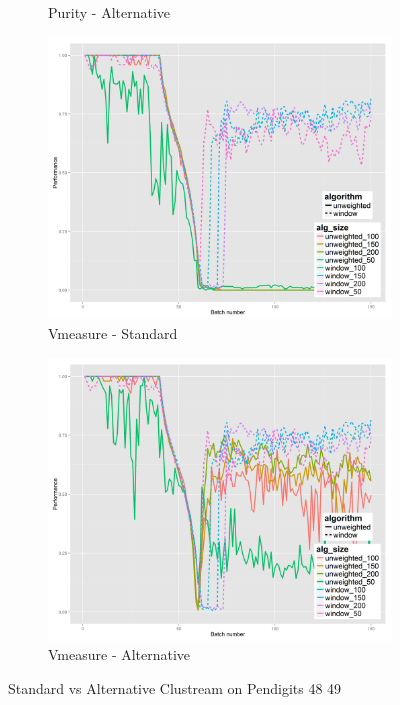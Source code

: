 \begin{figure}[H]
\begin{subfigure}[b]{0.47\textwidth}
                \caption{Purity - Alternative}
                \label{fig:pa_4849}
        \end{subfigure}
        \begin{subfigure}[b]{0.47\textwidth}
          \includegraphics[width=\textwidth]{standard_alt/ci_evolving_pen_48_49_standard_vmeasure.png}
                 \caption{Vmeasure - Standard}
                 \label{fig:vs_4849}
        \end{subfigure}
        \begin{subfigure}[b]{0.47\textwidth}
                 \includegraphics[width=\textwidth]{standard_alt/ci_evolving_pen_48_49_alternative_vmeasure.png}
                \caption{Vmeasure - Alternative}
                \label{fig:va_4849}
        \end{subfigure}
\caption{Standard vs Alternative Clustream on Pendigits 48 49}
\label{fig:standard_alternative_4849}
\end{figure}


